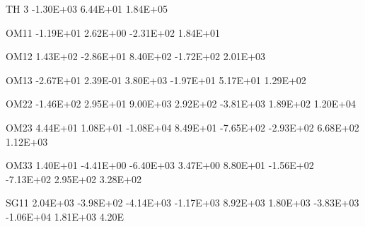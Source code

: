 \documentclass[
  11pt,
  krantz2, a4paper, twoside]{krantz}
\newenvironment{Shaded}{\begin{snugshade}}{\end{snugshade}}
\newcommand{\DecValTok}[1]{\textcolor[rgb]{0.00,0.00,0.81}{#1}}
\newcommand{\FloatTok}[1]{\textcolor[rgb]{0.00,0.00,0.81}{#1}}
\newcommand{\NormalTok}[1]{#1}
\theoremstyle{definition}
\theoremstyle{definition}
\theoremstyle{definition}
\theoremstyle{remark}
\begin{document}
\begin{Shaded}
\begin{Highlighting}[]
\NormalTok{TH }\DecValTok{3}   \FloatTok{{-}1.30E+03}  \FloatTok{6.44E+01}  \FloatTok{1.84E+05}                                                                   
                                                                                                       
\NormalTok{OM11   }\FloatTok{{-}1.19E+01}  \FloatTok{2.62E+00} \FloatTok{{-}2.31E+02}  \FloatTok{1.84E+01}                                                         
                                                                                                       
\NormalTok{OM12    }\FloatTok{1.43E+02} \FloatTok{{-}2.86E+01}  \FloatTok{8.40E+02} \FloatTok{{-}1.72E+02}  \FloatTok{2.01E+03}                                               
                                                                                                       
\NormalTok{OM13   }\FloatTok{{-}2.67E+01}  \FloatTok{2.39E{-}01}  \FloatTok{3.80E+03} \FloatTok{{-}1.97E+01}  \FloatTok{5.17E+01}  \FloatTok{1.29E+02}                                     
                                                                                                       
\NormalTok{OM22   }\FloatTok{{-}1.46E+02}  \FloatTok{2.95E+01}  \FloatTok{9.00E+03}  \FloatTok{2.92E+02} \FloatTok{{-}3.81E+03}  \FloatTok{1.89E+02}  \FloatTok{1.20E+04}                           
                                                                                                       
\NormalTok{OM23    }\FloatTok{4.44E+01}  \FloatTok{1.08E+01} \FloatTok{{-}1.08E+04}  \FloatTok{8.49E+01} \FloatTok{{-}7.65E+02} \FloatTok{{-}2.93E+02}  \FloatTok{6.68E+02}  \FloatTok{1.12E+03}                 
                                                                                                       
\NormalTok{OM33    }\FloatTok{1.40E+01} \FloatTok{{-}4.41E+00} \FloatTok{{-}6.40E+03}  \FloatTok{3.47E+00}  \FloatTok{8.80E+01} \FloatTok{{-}1.56E+02} \FloatTok{{-}7.13E+02}  \FloatTok{2.95E+02}  \FloatTok{3.28E+02}       
                                                                                                       
\NormalTok{SG11    }\FloatTok{2.04E+03} \FloatTok{{-}3.98E+02} \FloatTok{{-}4.14E+03} \FloatTok{{-}1.17E+03}  \FloatTok{8.92E+03}  \FloatTok{1.80E+03} \FloatTok{{-}3.83E+03} \FloatTok{{-}1.06E+04}  \FloatTok{1.81E+03}  \FloatTok{4.20}\NormalTok{E}
                                                                                                       

\end{Highlighting}
\end{Shaded}
\end{document}
